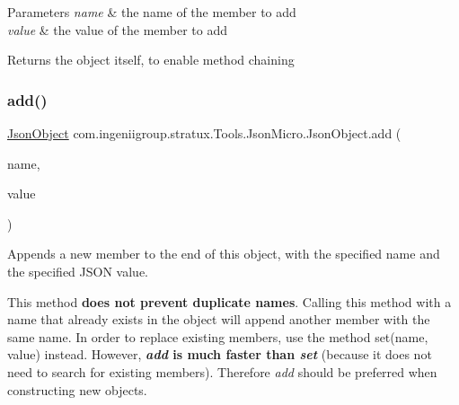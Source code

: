 \begin{DoxyParams}{Parameters}
{\em name} & the name of the member to add \\
\hline
{\em value} & the value of the member to add \\
\hline
\end{DoxyParams}
\begin{DoxyReturn}{Returns}
the object itself, to enable method chaining 
\end{DoxyReturn}
\mbox{\label{classcom_1_1ingeniigroup_1_1stratux_1_1_tools_1_1_json_micro_1_1_json_object_a2a9219c91008d05015ca53681f077743}} 
\subsubsection{\texorpdfstring{add()}{add()}\hspace{0.1cm}{\footnotesize\ttfamily [7/7]}}
{\footnotesize\ttfamily \hyperlink{classcom_1_1ingeniigroup_1_1stratux_1_1_tools_1_1_json_micro_1_1_json_object}{Json\+Object} com.\+ingeniigroup.\+stratux.\+Tools.\+Json\+Micro.\+Json\+Object.\+add (\begin{DoxyParamCaption}\item[{String}]{name,  }\item[{\hyperlink{classcom_1_1ingeniigroup_1_1stratux_1_1_tools_1_1_json_micro_1_1_json_value}{Json\+Value}}]{value }\end{DoxyParamCaption})}

Appends a new member to the end of this object, with the specified name and the specified J\+S\+ON value. 

This method {\bfseries does not prevent duplicate names}. Calling this method with a name that already exists in the object will append another member with the same name. In order to replace existing members, use the method {\ttfamily set(name, value)} instead. However, {\bfseries  {\itshape add} is much faster than {\itshape set}} (because it does not need to search for existing members). Therefore {\itshape add} should be preferred when constructing new objects. 


